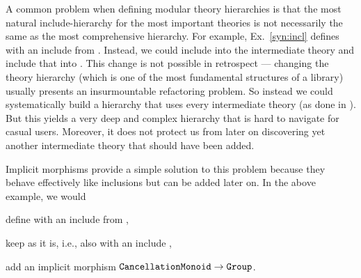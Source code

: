 A common problem when defining modular theory hierarchies is that the most natural include-hierarchy for the most important theories is not necessarily the same as the most comprehensive hierarchy.
For example, Ex.~\ref{syn:incl} defines  with an include from .
Instead, we could include  into the intermediate theory  and include that into .
This change is not possible in retrospect --- changing the theory hierarchy (which is one of the most fundamental structures of a library) usually presents an insurmountable refactoring problem.
So instead we could systematically build a hierarchy that uses every intermediate theory (as done in \cite{mathscheme}).
But this yields a very deep and complex hierarchy that is hard to navigate for casual users.
Moreover, it does not protect us from later on discovering yet another intermediate theory that should have been added.

Implicit morphisms provide a simple solution to this problem because they behave effectively like inclusions but can be added later on.
In the above example, we would
\begin{compactitem}
 \item define  with an include from ,
 \item keep  as it is, i.e., also with an include ,
 \item add an implicit morphism $\operatorname{\mathtt{CancellationMonoid}}\to\operatorname{\mathtt{Group}}$.
\end{compactitem}
\medskip

